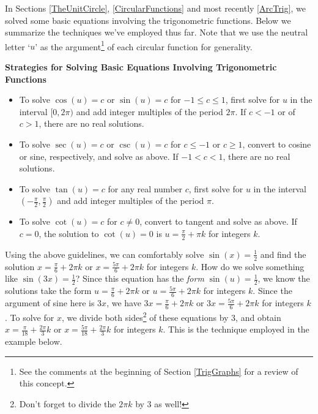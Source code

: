 

\setcounter{footnote}{0}

\label{TrigEquIneq}

In Sections \ref{TheUnitCircle}, \ref{CircularFunctions} and most recently \ref{ArcTrig}, we solved some basic equations involving the trigonometric functions. Below we summarize the techniques we've employed thus far.  Note that we use the neutral letter `$u$' as the argument\footnote{See the comments at the beginning of Section \ref{TrigGraphs} for a review of this concept.} of each circular function for generality.

\smallskip

\label{trigeqnstrategy1}

\colorbox{ResultColor}{\bbm
\centerline{\textbf{Strategies for Solving Basic Equations Involving Trigonometric Functions}}

\smallskip

\begin{itemize}

\item To solve $\cos(u) = c$ or $\sin(u) = c$ for $-1 \leq c \leq 1$, first solve for $u$ in the interval $[0,2\pi)$ and add integer multiples of the period $2\pi$.  If $c < -1$ or of $c > 1$, there are no real solutions.

\item To solve $\sec(u) = c$ or $\csc(u) = c$ for $c \leq -1$ or $c \geq 1$,  convert to cosine or sine, respectively, and solve as above.  If $-1 < c < 1$, there are no real solutions.

\item To solve  $\tan(u) = c$ for any real number $c$,  first solve for $u$ in the interval $\left(-\frac{\pi}{2}, \frac{\pi}{2}\right)$ and add integer multiples of the period $\pi$.

\item  To solve  $\cot(u) = c$ for $c \neq 0$, convert to tangent and solve as above.  If $c = 0$, the solution to $\cot(u) = 0$ is $u = \frac{\pi}{2} + \pi k$ for integers $k$.

\end{itemize}

\ebm}

\smallskip

Using the above guidelines, we can comfortably solve $\sin(x) = \frac{1}{2}$ and find the solution $x = \frac{\pi}{6} + 2\pi k$ or $x = \frac{5\pi}{6} + 2\pi k$ for integers $k$. How do we solve something like $\sin(3x) = \frac{1}{2}$?  Since this equation has the \textit{form} $\sin(u) = \frac{1}{2}$, we know the solutions take the form  $u= \frac{\pi}{6} + 2\pi k$ or $u = \frac{5\pi}{6} + 2\pi k$ for integers $k$. Since the argument of sine here is $3x$, we have $3x= \frac{\pi}{6} + 2\pi k$ or $3x = \frac{5\pi}{6} + 2\pi k$ for integers $k$. To solve for $x$, we divide both sides\footnote{Don't forget to divide the $2\pi k$ by $3$ as well!} of these equations by $3$, and obtain $x = \frac{\pi}{18} + \frac{2\pi}{3} k$ or $x = \frac{5\pi}{18} + \frac{2\pi}{3}k$ for integers $k$.  This is the technique employed in the example below.

